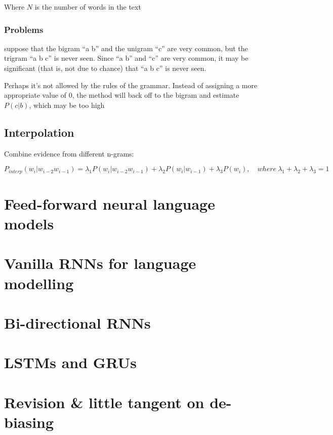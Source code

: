 \documentclass[11pt]{article}
\begin{document}
Where $N$ is the number of words in the text

\subsubsection{Problems}

suppose that the bigram ``a b'' and the unigram ``c'' are very common, but the trigram ``a b c'' is never seen. Since ``a b'' and ``c'' are very common, it may be significant (that is, not due to chance) that ``a b c'' is never seen.

Perhaps it's not allowed by the rules of the grammar.  Instead of assigning a more appropriate value of 0, the method will back off to the bigram and estimate $P(c | b)$, which may be too high

\subsection{Interpolation}

Combine evidence from different n-grams:

\begin{definition}[Interpolation]
    \begin{equation*}
        P_{interp}(w_i|w_{i-2}w_{i-1})=\lambda_1 P(w_i|w_{i-2} w_{i-1}) + \lambda_2 P(w_i|w_{i-1}) + \lambda_3 P(w_i), \quad where\ \lambda_1 + \lambda_2 + \lambda_3 = 1
    \end{equation*}
\end{definition}

\section{Feed-forward neural language models}

\section{Vanilla RNNs for language modelling}

\section{Bi-directional RNNs}

\section{LSTMs and GRUs}

\section{Revision \& little tangent on de-biasing}

\end{document}
